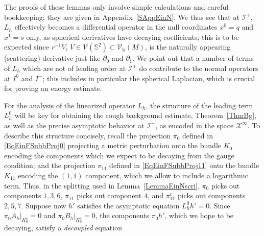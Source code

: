 \documentclass[reqno,11pt,letterpaper]{amsart}
\numberwithin{equation}{section}
\numberwithin{figure}{section}
\theoremstyle{definition}
\theoremstyle{remark}
\newcommand{\mc}{\mathcal}
\newcommand{\cV}{\mc V}
\newcommand{\cX}{\mc X}
\newcommand{\ms}{\mathscr}
\newcommand{\scri}{\ms I}
\newcommand{\Sph}{\mathbb{S}}
\newcommand{\pa}{\partial}
\newcommand{\bop}{{\mathrm{b}}}
\newcommand{\Vf}{\mathcal V}
\newcommand{\Vb}{\Vf_\bop}
\begin{document}
The proofs of these lemmas only involve simple calculations and careful bookkeeping; they are given in Appendix~\ref{SAppEinN}. We thus see that at $\scri^+$, $L_h$ effectively becomes a differential operator in the null coordinates $x^0=q$ and $x^1=s$ only, as spherical derivatives have decaying coefficients; this is to be expected since $r^{-1}V$, $V\in\cV(\Sph^2)\subset\Vb(M)$, is the naturally appearing (scattering) derivative just like $\pa_0$ and $\pa_1$. We point out that a number of terms of $L_h$ which are not of leading order at $\scri^+$ do contribute to the normal operators at $I^0$ and $I^+$; this includes in particular the spherical Laplacian, which is crucial for proving an energy estimate.

For the analysis of the linearized operator $L_h$, the structure of the leading term $L_h^0$ will be key for obtaining the rough background estimate, Theorem~\ref{ThmBg}, as well as the precise asymptotic behavior at $\scri^+$, as encoded in the space $\cX^\infty$. To describe this structure concisely, recall the projection $\pi_0$ defined in \eqref{EqEinFSubbProj0} projecting a metric perturbation onto the bundle $K_0$ encoding the components which we expect to be decaying from the gauge condition; and the projection $\pi_{1 1}$ defined in \eqref{EqEinFSubbProj11} onto the bundle $K_{1 1}$ encoding the $(1,1)$ component, which we allow to include a logarithmic term. Thus, in the splitting used in Lemma~\ref{LemmaEinNscri}, $\pi_0$ picks out components $1,3,6$, $\pi_{1 1}$ picks out component $4$, and $\pi_{1 1}^c$ picks out components $2,5,7$. Suppose now $h'$ satisfies the asymptotic equation $L_h^0 h'=0$. Since $\pi_0 A_h|_{K_0^c}=0$ and $\pi_0 B_h|_{K_0^c}=0$, the components $\pi_0 h'$, which we hope to be decaying, satisfy a \emph{decoupled} equation
\end{document}
